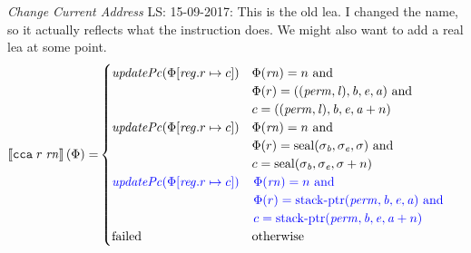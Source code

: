 \documentclass[a3paper]{article}
\newcommand\lau[1]{{\color{purple} \sf \footnotesize {LS: #1}}\\}
\newcommand{\sem}[1]{\left\llbracket #1 \right\rrbracket}
\newcommand{\tand}{\text{ and }}
\newcommand{\totherwise}{\text{otherwise }}
\newcommand{\sourcecolor}{\color{blue}}
\newcommand{\src}[1]{{\sourcecolor #1}}
\newcommand{\targetcolor}[1]{\color{black}}
\newcommand{\trg}[1]{{\targetcolor{} #1}}
\newcommand{\zinstr}[1]{\texttt{#1}}
\newcommand{\twoinstr}[3]{
  \ifthenelse{\equal{#2#3}{}}
  {\zinstr{#1}}
  {\zinstr{#1} \; #2 \; #3}
}
\newcommand{\tcca}[2]{\twoinstr{\trg{cca}}{#1}{#2}}
\newcommand{\update}[2]{[#1 \mapsto #2]}
\newcommand{\updReg}[2]{\update{\reg.#1}{#2}}
\newcommand{\shareddom}[1]{\mathrm{#1}}
\newcommand{\perm}{\var{perm}}
\newcommand{\lin}{\var{l}}
\newcommand{\stkptr}[1]{\mathrm{stack\text{-}ptr}(#1)}
\newcommand{\seal}[1]{\shareddom{seal}(#1)}
\newcommand{\failed}{\mathrm{failed}}
\newcommand{\var}[1]{\mathit{#1}}
\newcommand{\rn}{\var{rn}}
\newcommand{\reg}{\var{reg}}
\newcommand{\baddr}{\var{b}}
\newcommand{\eaddr}{\var{e}}
\newcommand{\aaddr}{\var{a}}
\newcommand{\plainfun}[2]{
  \ifthenelse{\equal{#2}{}}
  {\mathit{#1}}
  {\mathit{#1}(#2)}
}
\newcommand{\updPcAddr}[1]{\plainfun{updatePc}{#1}}
\begin{document}
\emph{Change Current Address}
\lau{15-09-2017: This is the old lea. I changed the name, so it actually reflects what the instruction does. We might also want to add a real lea at some point.}
\begin{align*}
  \sem{\tcca{r}{\rn}}(\Phi) = & 
                                  \begin{cases}
                                    \updPcAddr{\Phi\updReg{r}{c}} &  
                                    \arraycolsep=0pt
                                    \begin{array}[t]{l}
                                      \Phi(\rn) = n \tand \\
                                      \Phi(r) = ((\perm,\lin),\baddr,\eaddr,\aaddr) \tand \\
                                      c = ((\perm,\lin),\baddr,\eaddr,\aaddr + n)
                                    \end{array}
                                    \\
                                    \updPcAddr{\Phi\updReg{r}{c}} &  
                                    \arraycolsep=0pt
                                    \begin{array}[t]{l}
                                      \Phi(\rn) = n \tand \\
                                      \Phi(r) = \seal{\sigma_\baddr,\sigma_\eaddr,\sigma} \tand \\
                                      c = \seal{\sigma_\baddr,\sigma_\eaddr,\sigma + n}
                                    \end{array}
                                    \\
                                    \src{\updPcAddr{\Phi\updReg{r}{c}}} &  
                                    \sourcecolor\left.
                                    \arraycolsep=0pt
                                    \begin{array}[t]{l}
                                      \Phi(\rn) = n\tand \\
                                      \Phi(r) = \stkptr{\perm,\baddr,\eaddr,\aaddr} \tand \\
                                      c = \stkptr{\perm,\baddr,\eaddr,\aaddr + n}
                                    \end{array}\right.
                                    \\
                                    \failed & \totherwise
                                  \end{cases}
\end{align*}
\end{document}
